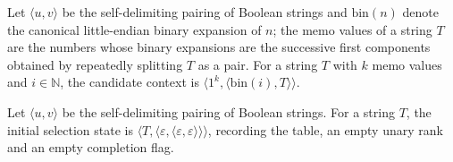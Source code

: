 \begin{definition}
\label{Complexity.ladner_selectCtx}
\leanok
{}
Let $\langle u,v\rangle$ be the self-delimiting pairing of Boolean strings and $\mathrm{bin}(n)$ denote the canonical little-endian binary expansion of $n$; the memo
values of a string $T$ are the numbers whose binary expansions are the successive first
components obtained by repeatedly splitting $T$ as a pair. For a string $T$ with $k$ memo values
and $i\in\mathbb N$, the candidate context is $\langle 1^{k},\langle\mathrm{bin}(i),T\rangle\rangle$.
\end{definition}

\begin{definition}
\label{Complexity.ladner_selectInit}
\leanok
{}
Let $\langle u,v\rangle$ be the self-delimiting pairing of Boolean strings. For a string $T$, the
initial selection state is $\langle T,\langle\varepsilon,\langle\varepsilon,\varepsilon\rangle\rangle\rangle$,
recording the table, an empty unary rank and an empty completion flag.
\end{definition}

